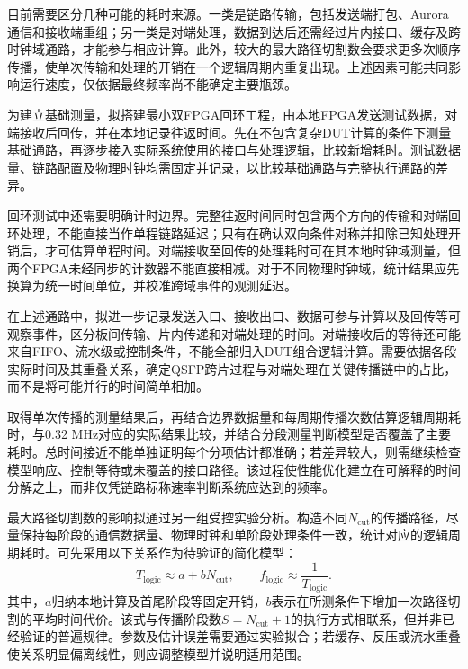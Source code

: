 目前需要区分几种可能的耗时来源。一类是链路传输，包括发送端打包、Aurora通信和接收端重组；另一类是对端处理，数据到达后还需经过片内接口、缓存及跨时钟域通路，才能参与相应计算。此外，较大的最大路径切割数会要求更多次顺序传播，使单次传输和处理的开销在一个逻辑周期内重复出现。上述因素可能共同影响运行速度，仅依据最终频率尚不能确定主要瓶颈。

为建立基础测量，拟搭建最小双FPGA回环工程，由本地FPGA发送测试数据，对端接收后回传，并在本地记录往返时间。先在不包含复杂DUT计算的条件下测量基础通路，再逐步接入实际系统使用的接口与处理逻辑，比较新增耗时。测试数据量、链路配置及物理时钟均需固定并记录，以比较基础通路与完整执行通路的差异。

回环测试中还需要明确计时边界。完整往返时间同时包含两个方向的传输和对端回环处理，不能直接当作单程链路延迟；只有在确认双向条件对称并扣除已知处理开销后，才可估算单程时间。对端接收至回传的处理耗时可在其本地时钟域测量，但两个FPGA未经同步的计数器不能直接相减。对于不同物理时钟域，统计结果应先换算为统一时间单位，并校准跨域事件的观测延迟。

在上述通路中，拟进一步记录发送入口、接收出口、数据可参与计算以及回传等可观察事件，区分板间传输、片内传递和对端处理的时间。对端接收后的等待还可能来自FIFO、流水级或控制条件，不能全部归入DUT组合逻辑计算。需要依据各段实际时间及其重叠关系，确定QSFP跨片过程与对端处理在关键传播链中的占比，而不是将可能并行的时间简单相加。

取得单次传播的测量结果后，再结合边界数据量和每周期传播次数估算逻辑周期耗时，与0.32 MHz对应的实际结果比较，并结合分段测量判断模型是否覆盖了主要耗时。总时间接近不能单独证明每个分项估计都准确；若差异较大，则需继续检查模型响应、控制等待或未覆盖的接口路径。该过程使性能优化建立在可解释的时间分解之上，而非仅凭链路标称速率判断系统应达到的频率。

最大路径切割数的影响拟通过另一组受控实验分析。构造不同$N_{\mathrm{cut}}$的传播路径，尽量保持每阶段的通信数据量、物理时钟和单阶段处理条件一致，统计对应的逻辑周期耗时。可先采用以下关系作为待验证的简化模型：
\begin{equation}
    T_{\mathrm{logic}}\approx a+bN_{\mathrm{cut}},
    \qquad f_{\mathrm{logic}}\approx\frac{1}{T_{\mathrm{logic}}}.
    \label{eq:midterm-path-cut-performance-model}
\end{equation}
其中，$a$归纳本地计算及首尾阶段等固定开销，$b$表示在所测条件下增加一次路径切割的平均时间代价。该式与传播阶段数$S=N_{\mathrm{cut}}+1$的执行方式相联系，但并非已经验证的普遍规律。参数及估计误差需要通过实验拟合；若缓存、反压或流水重叠使关系明显偏离线性，则应调整模型并说明适用范围。

